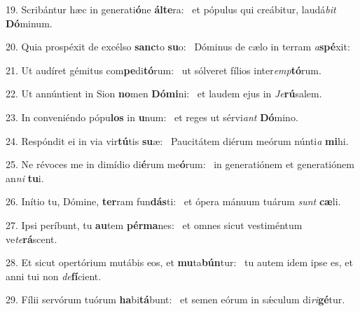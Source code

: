 19. Scribántur hæc in generati\textbf{ó}ne \textbf{ál}\textbf{te}ra: \ast\  et pópulus qui creábitur, laudá\textit{bit} \textbf{Dó}minum.\

20. Quia prospéxit de excélso \textbf{sanc}to \textbf{su}o: \ast\  Dóminus de cælo in terram \textit{a}\textbf{spé}xit:\

21. Ut audíret gémitus com\textbf{pe}di\textbf{tó}rum: \ast\  ut sólveret fílios inter\textit{emp}\textbf{tó}rum.\

22. Ut annúntient in Sion \textbf{no}men \textbf{Dó}\textbf{mi}ni: \ast\  et laudem ejus in \textit{Je}\textbf{rú}salem.\

23. In conveniéndo pópu\textbf{los} in \textbf{u}num: \ast\  et reges ut sérvi\textit{ant} \textbf{Dó}mino.\

24. Respóndit ei in via vir\textbf{tú}tis \textbf{su}æ: \ast\  Paucitátem diérum meórum núnti\textit{a} \textbf{mi}hi.\

25. Ne révoces me in dimídio di\textbf{é}rum me\textbf{ó}rum: \ast\  in generatiónem et generatiónem an\textit{ni} \textbf{tu}i.\

26. Inítio tu, Dómine, \textbf{ter}ram fun\textbf{dás}ti: \ast\  et ópera mánuum tuárum \textit{sunt} \textbf{cæ}li.\

27. Ipsi períbunt, tu \textbf{au}tem \textbf{pér}\textbf{ma}nes: \ast\  et omnes sicut vestiméntum ve\textit{te}\textbf{rá}scent.\

28. Et sicut opertórium mutábis eos, et \textbf{mu}ta\textbf{bún}tur: \ast\  tu autem idem ipse es, et anni tui non \textit{de}\textbf{fí}cient.\

29. Fílii servórum tuórum \textbf{ha}bi\textbf{tá}bunt: \ast\  et semen eórum in sǽculum di\textit{ri}\textbf{gé}tur.\

